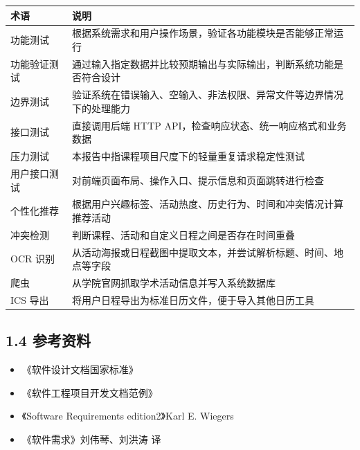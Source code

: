 {\def\LTcaptype{none} %
\begin{longtable}[]{@{}|
  >{\raggedright\arraybackslash}p{}|
  >{\raggedright\arraybackslash}p{}|@{}}
\hline
\rowcolor{gray!12}
\begin{minipage}[b]{\linewidth}\raggedright
\bfseries 术语
\end{minipage} & \begin{minipage}[b]{\linewidth}\raggedright
\bfseries 说明
\end{minipage} \\
\hline
\endhead
\hline
\endlastfoot
功能测试 & 根据系统需求和用户操作场景，验证各功能模块是否能够正常运行 \\
\hline
功能验证测试 &
通过输入指定数据并比较预期输出与实际输出，判断系统功能是否符合设计 \\
\hline
边界测试 &
验证系统在错误输入、空输入、非法权限、异常文件等边界情况下的处理能力 \\
\hline
接口测试 & 直接调用后端 HTTP
API，检查响应状态、统一响应格式和业务数据 \\
\hline
压力测试 & 本报告中指课程项目尺度下的轻量重复请求稳定性测试 \\
\hline
用户接口测试 & 对前端页面布局、操作入口、提示信息和页面跳转进行检查 \\
\hline
个性化推荐 &
根据用户兴趣标签、活动热度、历史行为、时间和冲突情况计算推荐活动 \\
\hline
冲突检测 & 判断课程、活动和自定义日程之间是否存在时间重叠 \\
\hline
OCR 识别 &
从活动海报或日程截图中提取文本，并尝试解析标题、时间、地点等字段 \\
\hline
爬虫 & 从学院官网抓取学术活动信息并写入系统数据库 \\
\hline
ICS 导出 & 将用户日程导出为标准日历文件，便于导入其他日历工具 \\
\hline
\end{longtable}
}

\subsection{1.4 参考资料}\label{ux53c2ux8003ux8d44ux6599}

\begin{itemize}
\tightlist
\item
  《软件设计文档国家标准》
\item
  《软件工程项目开发文档范例》
\item
  《Software Requirements edition2》Karl E. Wiegers
\item
  《软件需求》刘伟琴、刘洪涛 译
\end{itemize}

